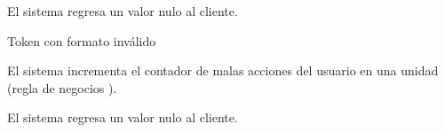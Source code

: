{\begin{trayectoriaAlternativa}
    \item El sistema regresa un valor nulo al cliente.

  \end{trayectoriaAlternativa}

  \begin{trayectoriaAlternativa}
    {Token con formato inválido}

    \item El sistema incrementa el contador de malas acciones del usuario
      en una unidad (regla de negocios ).

    \item El sistema regresa un valor nulo al cliente.

  \end{trayectoriaAlternativa}
}
